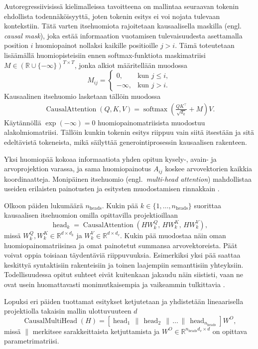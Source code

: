 Autoregressiivisissä kielimalleissa tavoitteena on mallintaa seuraavan tokenin ehdollista todennäköisyyttä, joten tokenin esitys ei voi nojata tulevaan kontekstiin. Tätä varten itsehuomiota rajoitetaan kausaalisella maskilla (engl. \emph{causal mask}), joka estää informaation vuotamisen tulevaisuudesta asettamalla position \(i\) huomiopainot nollaksi kaikille positioille \(j > i\). Tämä toteutetaan lisäämällä huomiopisteisiin ennen
softmax-funktiota maskimatriisi
\(M \in (\mathbb{R} \cup \{-\infty\})^{T \times T}\),
jonka alkiot määritellään muodossa
$$
M_{ij} =
\begin{cases}
  0, & \text{kun } j \le i, \\
  -\infty, & \text{kun } j > i.
\end{cases}
$$
Kausaalinen itsehuomio lasketaan tällöin muodossa
\begin{align*}
  \operatorname{CausalAttention}(Q,K,V) = \operatorname{softmax}\left(\frac{QK^{\top}}{\sqrt{d_k}} + M\right)V.
\end{align*}
Käytännöllä \(\exp(-\infty) = 0\) huomiopainomatriisista muodostuu alakolmiomatriisi. Tällöin kunkin tokenin esitys riippuu vain siitä itsestään ja sitä edeltävistä tokeneista, mikä säilyttää generointiprosessin kausaalisen rakenteen.

Yksi huomiopää kokoaa informaatiota yhden opitun kysely-, avain- ja
arvoprojektion varassa, ja sama huomiopainotus \(A_{ij}\) koskee
arvovektorien kaikkia koordinaatteja. Monipäinen itsehuomio
(engl.\ \emph{multi-head attention}) mahdollistaa useiden
erilaisten painotusten ja esitysten muodostamisen rinnakkain \cite{vaswani2017attention}.

Olkoon päiden lukumäärä \(n_\text{heads}\). Kukin pää
\(k \in \{1,\dots,n_\text{heads}\}\) suorittaa kausaalisen itsehuomion
omilla opittavilla projektioillaan
$$
\operatorname{head}_k
=
\operatorname{CausalAttention}
\left(
  H W_k^Q,\,
  H W_k^K,\,
  H W_k^V
\right),
$$
missä \(W_k^Q, W_k^K \in \mathbb{R}^{d \times d_k}\) ja
\(W_k^V \in \mathbb{R}^{d \times d_v}\). Kukin pää muodostaa näin oman huomiopainomatriisinsa ja omat painotetut summansa arvovektoreista. Päät voivat oppia toisiaan täydentäviä riippuvuuksia. Esimerkiksi yksi pää saattaa keskittyä syntaktisiin rakenteisiin ja toinen laajempiin semanttisiin yhteyksiin. Todellisuudessa opitut suhteet eivät kuitenkaan jakaudu näin siististi, vaan ne ovat usein huomattavasti monimutkaisempia ja vaikeammin tulkittavia \cite{clark2019what}.

Lopuksi eri päiden tuottamat esitykset ketjutetaan ja
yhdistetään lineaarisella projektiolla takaisin mallin
ulottuvuuteen \(d\)
$$
\operatorname{CausalMultiHead}(H)
=
\left[
  \operatorname{head}_1
  \,\|\,
  \operatorname{head}_2
  \,\|\,
  \dots
  \,\|\,
  \operatorname{head}_{n_\text{heads}}
\right] W^O,
$$
missä \(\|\) merkitsee sarakkeittaista ketjuttamista ja
\(W^O \in \mathbb{R}^{n_\text{heads} d_v \times d}\) on opittava
parametrimatriisi.

